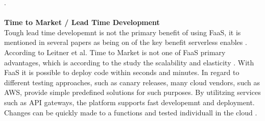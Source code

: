 \documentclass[a4paper,twoside,11pt, pagesize]{scrartcl}
\begin{document}
\cite{elgamal2018costless}.\\\\ \textbf{Time to Market / Lead Time Development}\\ Tough lead time developemnt is not the primary benefit of using FaaS, it is mentioned in several papers as being on of the key benefit serverless enables \cite{adzic2017serverless} \cite{ast2017self}. According to Leitner et al. Time to Market is not one of FaaS primary advantages, which is according to the study the scalability and elasticity \cite{leitner2019mixed}. With FaaS it is possible to deploy code within seconds and minutes. In regard to different testing approaches, such as canary releases, many cloud vendors, such as AWS, provide simple predefined solutions for such purposes. By utilitzing services such as API gateways, the platform supports fast developemnt and deployment. Changes can be quickly made to a functions and tested individuall in the cloud \cite{sewak2018winning}.\\\\
\end{document}
